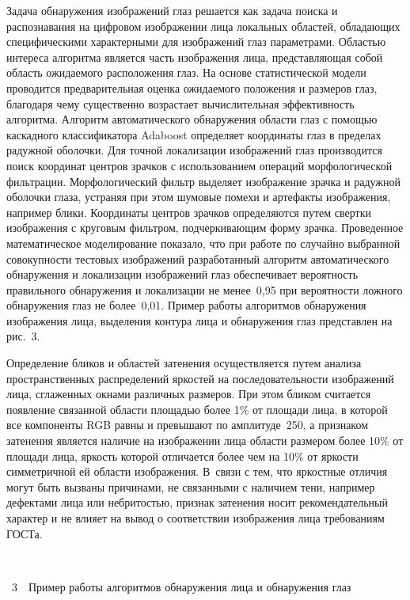 \begin{multicols}{2}
Задача обнаружения изображений глаз решается как задача поиска и распознавания на цифро\-вом изображении лица локальных 
областей, об\-ладающих специфическими характерными для\linebreak
 изображений глаз параметрами. Областью интереса алгоритма 
является часть изображения лица, пред\-став\-ля\-ющая собой область ожидаемого расположения глаз. На основе статистической 
модели проводится предварительная оценка ожидаемого положения и размеров глаз, благодаря чему существенно возрастает 
вычислительная эффективность алгоритма. Алгоритм автоматического обнаружения области глаз с помощью каскадного 
классификатора Adaboost определяет координаты глаз в пределах радужной оболочки. Для точной локализации изображений глаз 
производится поиск координат центров зрачков с использованием операций морфологической фильтрации. Морфологический 
фильтр выделяет изображение зрачка и радужной оболочки глаза, устраняя при этом шумовые помехи и артефакты изображения, 
например блики. Координаты центров зрачков определяются путем свертки изображения с круговым фильтром, 
подчеркивающим форму зрачка. Проведенное математическое моделирование показало, что при работе по случайно выбранной 
совокупности тестовых изображений разработанный алгоритм автоматического обнаружения и локализации изображений глаз 
обеспечивает вероятность правильного обнаружения и локализации не менее~0,95 при ве\-ро\-ят\-ности ложного обнаружения глаз не 
более~0,01. Пример работы алгоритмов обнаружения изображения лица, выделения контура лица и обнаружения глаз 
представлен на рис.~3.

Определение бликов и областей затенения осуществляется путем анализа пространственных распределений яркостей на 
последовательности изоб\-ра\-же\-ний лица, сглаженных окнами различных\linebreak
 размеров. При этом бликом считается появление 
связанной области площадью более 1\% от площади лица, в которой все компоненты RGB равны и превышают по 
амплитуде~250, а признаком затенения является наличие на изображении лица об\-ласти размером более 10\% от площади лица, 
яркость которой отличается более чем на 10\% от яркости симметричной ей об\-ласти изображения. В~связи с тем, что яркостные 
отличия могут быть вызваны причинами, не связанными с наличием тени, например
 дефектами лица или небритостью, признак 
затенения носит рекомендательный характер и не влияет на вывод о соответствии изображения лица требованиям ГОСТа. 
\begin{center} %
\mbox{%
\epsfxsize=70mm
}
\end{center}
\vspace*{6pt}
{{\figurename~3}\ \ \small{Пример работы алгоритмов обнаружения лица и обнаружения глаз}}



\end{multicols}
